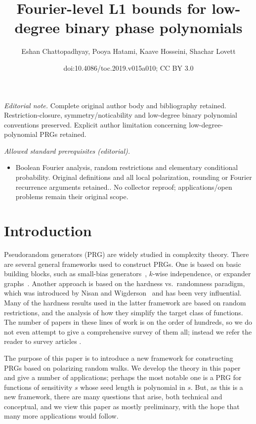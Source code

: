 \documentclass[11pt]{article}
\title{Fourier-level L1 bounds for low-degree binary phase polynomials}
\author{Eshan Chattopadhyay, Pooya Hatami, Kaave Hosseini, Shachar Lovett}
\date{doi:10.4086/toc.2019.v015a010; CC BY 3.0}
\numberwithin{equation}{section}
\theoremstyle{definition}
\theoremstyle{plain}
\begin{document}
\maketitle
\noindent\textit{Editorial note.} Complete original author body and bibliography retained. Restriction-closure, symmetry/noticability and low-degree binary polynomial conventions preserved. Explicit author limitation concerning low-degree-polynomial PRGs retained.\par\medskip
\noindent\textit{Allowed standard prerequisites (editorial).}\begin{itemize}
\item Boolean Fourier analysis, random restrictions and elementary conditional probability. Original definitions and all local polarization, rounding or Fourier recurrence arguments retained.. No collector reproof; applications/open problems remain their original scope.
\end{itemize}\medskip
\section{Introduction}

Pseudorandom generators (PRG) are widely studied in complexity theory. There are several general frameworks used to construct PRGs.
One is based on basic building blocks, such as
%
small-bias   %
generators~\cite{naor1993small,alon1992simple}, $k$-wise independence,
or expander graphs~\cite{hoory2006expander}. Another approach is based on
the %
hardness vs.\ randomness paradigm, which was introduced by
Nisan and Wigderson~\cite{nisan1988hardness} and has been very influential. Many of the hardness results used in the latter framework
are based on random restrictions, and the analysis of how
they simplify the target class of functions.
%
The number of papers in these lines of work is on the
order of hundreds, so we do not even attempt to give a comprehensive survey of them all; instead we refer the reader to survey articles \cite{goldreich2010primer,vadhan2012pseudorandomness}.

The purpose of this paper is to introduce a new framework for constructing PRGs based on polarizing random walks. We develop the theory
in this paper and give a number of applications; perhaps the most notable one is a PRG for functions of sensitivity $s$ whose seed
length is polynomial in $s$. But, as this is a new framework, there are many questions that arise, both technical and conceptual,
and we view this paper as mostly preliminary, with the hope that many more applications would follow.
\end{document}
